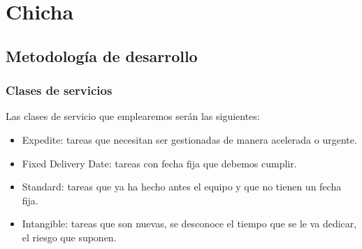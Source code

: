 \chapter{Chicha}
\label{cap:chicha}

\section{Metodología de desarrollo}
\subsection{Clases de servicios}
Las clases de servicio que emplearemos serán las siguientes:
\begin{itemize}
    \item Expedite: tareas que necesitan ser gestionadas de manera acelerada o urgente.  
    \item Fixed Delivery Date: tareas con fecha fija que debemos cumplir.
    \item Standard: tareas que ya ha hecho antes el equipo y que no tienen un fecha fija.
    \item Intangible: tareas que son nuevas, se desconoce el tiempo que se le va dedicar, el riesgo que suponen.
    \end{itemize}



